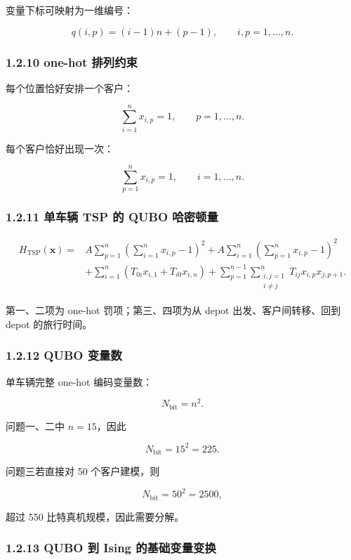 \documentclass[
  a4paper,
]{ctexart}
\begin{document}
变量下标可映射为一维编号：

\[
q(i,p)=(i-1)n+(p-1),\qquad i,p=1,\ldots,n.
\]

\subsubsection{1.2.10 one-hot
排列约束}\label{one-hot-ux6392ux5217ux7ea6ux675f}

每个位置恰好安排一个客户：

\[
\sum_{i=1}^{n}x_{i,p}=1,\qquad p=1,\ldots,n.
\]

每个客户恰好出现一次：

\[
\sum_{p=1}^{n}x_{i,p}=1,\qquad i=1,\ldots,n.
\]

\subsubsection{1.2.11 单车辆 TSP 的 QUBO
哈密顿量}\label{ux5355ux8f66ux8f86-tsp-ux7684-qubo-ux54c8ux5bc6ux987fux91cf}

\[
\begin{aligned}
H_{\mathrm{TSP}}(\mathbf{x})=&
A\sum_{p=1}^{n}\left(\sum_{i=1}^{n}x_{i,p}-1\right)^2
+A\sum_{i=1}^{n}\left(\sum_{p=1}^{n}x_{i,p}-1\right)^2 \\
&+\sum_{i=1}^{n}\left(T_{0i}x_{i,1}+T_{i0}x_{i,n}\right)
+\sum_{p=1}^{n-1}\sum_{\substack{i,j=1\\ i\ne j}}^{n}T_{ij}x_{i,p}x_{j,p+1}.
\end{aligned}
\]

第一、二项为 one-hot 罚项；第三、四项为从 depot 出发、客户间转移、回到
depot 的旅行时间。

\subsubsection{1.2.12 QUBO 变量数}\label{qubo-ux53d8ux91cfux6570}

单车辆完整 one-hot 编码变量数：

\[
N_{\mathrm{bit}}=n^2.
\]

问题一、二中 \(n=15\)，因此

\[
N_{\mathrm{bit}}=15^2=225.
\]

问题三若直接对 50 个客户建模，则

\[
N_{\mathrm{bit}}=50^2=2500,
\]

超过 550 比特真机规模，因此需要分解。

\subsubsection{1.2.13 QUBO 到 Ising
的基础变量变换}\label{qubo-ux5230-ising-ux7684ux57faux7840ux53d8ux91cfux53d8ux6362}
\end{document}
